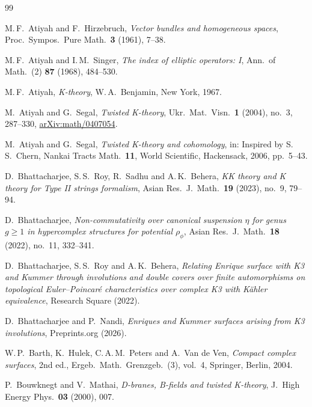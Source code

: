 \documentclass[reqno,11pt]{amsart}
\theoremstyle{definition}
\begin{document}
{\raggedright
\begin{thebibliography}{99}

M.\,F.~Atiyah and F.~Hirzebruch,
\emph{Vector bundles and homogeneous spaces},
Proc.\ Sympos.\ Pure Math.\ \textbf{3} (1961), 7--38.

M.\,F.~Atiyah and I.\,M.~Singer,
\emph{The index of elliptic operators: I},
Ann.\ of Math.\ (2) \textbf{87} (1968), 484--530.

M.\,F.~Atiyah,
\emph{K-theory},
W.\,A.~Benjamin, New York, 1967.

M.~Atiyah and G.~Segal,
\emph{Twisted K-theory},
Ukr.\ Mat.\ Visn.\ \textbf{1} (2004), no.~3, 287--330, \href{https://arxiv.org/abs/math/0407054}{arXiv:math/0407054}.

M.~Atiyah and G.~Segal,
\emph{Twisted K-theory and cohomology},
in: Inspired by S.\,S.~Chern, Nankai Tracts Math.\ \textbf{11}, World Scientific, Hackensack, 2006, pp.~5--43.

D.~Bhattacharjee, S.\,S.~Roy, R.~Sadhu and A.\,K.~Behera,
\emph{KK theory and K theory for Type II strings formalism},
Asian Res.\ J.\ Math.\ \textbf{19} (2023), no.~9, 79--94.

D.~Bhattacharjee,
\emph{Non-commutativity over canonical suspension $\eta$ for genus $g\ge1$ in hypercomplex structures for potential $\rho_\phi$},
Asian Res.\ J.\ Math.\ \textbf{18} (2022), no.~11, 332--341.

D.~Bhattacharjee, S.\,S.~Roy and A.\,K.~Behera,
\emph{Relating Enrique surface with K3 and Kummer through involutions and double covers over finite automorphisms on topological Euler--Poincar\'e characteristics over complex K3 with K\"ahler equivalence},
Research Square (2022).

D.~Bhattacharjee and P.~Nandi,
\emph{Enriques and Kummer surfaces arising from K3 involutions},
Preprints.org (2026).

W.\,P.~Barth, K.~Hulek, C.\,A.\,M.~Peters and A.~Van de Ven,
\emph{Compact complex surfaces}, 2nd ed.,
Ergeb.\ Math.\ Grenzgeb.\ (3), vol.~4, Springer, Berlin, 2004.

P.~Bouwknegt and V.~Mathai,
\emph{D-branes, B-fields and twisted K-theory},
J.\ High Energy Phys.\ \textbf{03} (2000), 007.


\end{thebibliography}}
\end{document}
